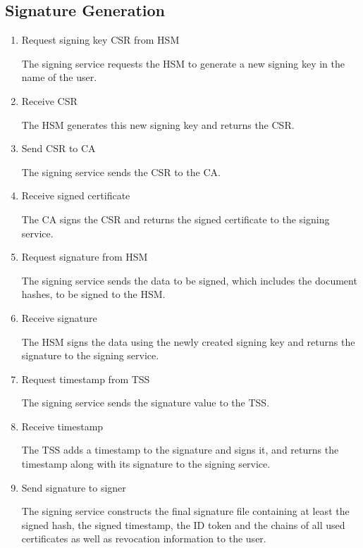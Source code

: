 \subsection{Signature Generation}\label{subsec:signature-generation}
\begin{enumerate}[resume]
    \item Request signing key \gls{CSR} from \gls{HSM}

    The signing service requests the \gls{HSM} to generate a new signing key in the name of the user.

    \item Receive \gls{CSR}

    The \gls{HSM} generates this new signing key and returns the \acrfull{CSR}.

    \item Send \gls{CSR} to \gls{CA}

    The signing service sends the \gls{CSR} to the \gls{CA}.

    \item Receive signed certificate

    The \gls{CA} signs the \gls{CSR} and returns the signed certificate to the signing service.

    \item Request signature from \gls{HSM}

    The signing service sends the data to be signed, which includes the document hashes, to be signed to the \gls{HSM}.

    \item Receive signature

    The \gls{HSM} signs the data using the newly created signing key and returns the signature to the signing service.

    \item Request timestamp from \gls{TSS}

    The signing service sends the signature value to the \gls{TSS}.

    \item Receive timestamp

    The \gls{TSS} adds a timestamp to the signature and signs it,
    and returns the timestamp along with its signature to the signing service.

    \item Send signature to signer

    The signing service constructs the final signature file containing at least the signed hash,
    the signed timestamp, the ID token and the chains of all used certificates as well as revocation information to the user.
\end{enumerate}

